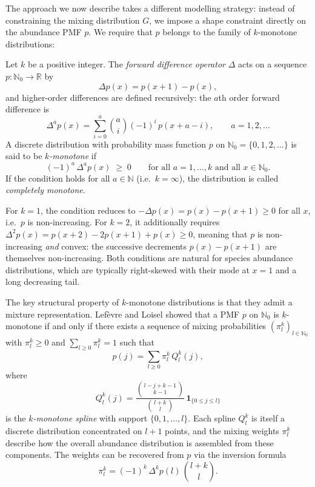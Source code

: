 \documentclass{article}
\begin{document}
{The approach we now describe takes a different modelling strategy: instead of constraining the mixing distribution $G$, we impose a shape constraint directly on the abundance PMF $p$. We require that $p$ belongs to the family of $k$-monotone distributions:

Let $k$ be a positive integer. The \emph{forward difference operator} $\Delta$ acts on a sequence $p \colon \mathbb{N}_0 \to \mathbb{R}$ by
\[
\Delta p(x) = p(x+1) - p(x),
\]
and higher-order differences are defined recursively: the $a$th order forward difference is
\[
\Delta^a p(x) = \sum_{i=0}^{a} \binom{a}{i} (-1)^{i}\, p(x + a - i), \qquad a = 1, 2, \ldots
\]
A discrete distribution with probability mass function $p$ on $\mathbb{N}_0 = \{0, 1, 2, \ldots\}$ is said to be \emph{$k$-monotone} if
\[
(-1)^a \,\Delta^a p(x) \;\geq\; 0 \qquad \text{for all } a = 1, \ldots, k \text{ and all } x \in \mathbb{N}_0.
\]
If the condition holds for all $a \in \mathbb{N}$ (i.e.\ $k = \infty$), the distribution is called \emph{completely monotone}.


For $k = 1$, the condition reduces to $-\Delta p(x) = p(x) - p(x+1) \geq 0$ for all $x$, i.e.\ $p$ is non-increasing. For $k = 2$, it additionally requires $\Delta^2 p(x) = p(x+2) - 2p(x+1) + p(x) \geq 0$, meaning that $p$ is non-increasing \emph{and} convex: the successive decrements $p(x) - p(x+1)$ are themselves non-increasing. Both conditions are natural for species abundance distributions, which are typically right-skewed with their mode at $x = 1$ and a long decreasing tail.

The key structural property of $k$-monotone distributions is that they admit a mixture representation. Lefèvre and Loisel \cite{LefevreLoisel2013} showed that a PMF $p$ on $\mathbb{N}_0$ is $k$-monotone if and only if there exists a sequence of mixing probabilities $(\pi^k_l)_{l \in \mathbb{N}_0}$ with $\pi^k_l \geq 0$ and $\sum_{l \geq 0} \pi^k_l = 1$ such that
\[
p(j) = \sum_{l \geq 0} \pi^k_l \, Q^k_l(j),
\]
where
\[
Q^k_l(j) = \frac{\binom{l - j + k - 1}{k-1}}{\binom{l+k}{l}} \, \mathbf{1}_{\{0 \leq j \leq l\}}
\]
is the \emph{$k$-monotone spline} with support $\{0, 1, \ldots, l\}$. Each spline $Q^k_l$ is itself a discrete distribution concentrated on $l+1$ points, and the mixing weights $\pi^k_l$ describe how the overall abundance distribution is assembled from these components. The weights can be recovered from $p$ via the inversion formula
\[
\pi^k_l = (-1)^k \, \Delta^k p(l) \, \binom{l+k}{l}.
\]

}
\end{document}
